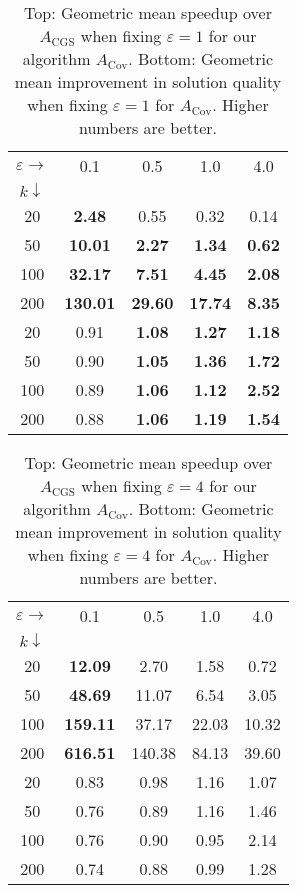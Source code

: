         \begin{table}[h!]
        \centering
        \caption{Top: Geometric mean speedup over $A_{\text{CGS}}$ when fixing $\varepsilon = 1$ for our algorithm $A_{\text{Cov}}$. Bottom: Geometric mean improvement in solution quality when fixing $\varepsilon = 1$ for $A_{\text{Cov}}$. Higher numbers are better.}
        \begin{tabular}{c|cccc}
        $\varepsilon \rightarrow$ & 0.1 & 0.5 & 1.0 & 4.0 \\
        $k \downarrow$ & & & & \\
        \hline
        20 & \textbf{2.48} & 0.55 & 0.32 & 0.14 \\
        50 & \textbf{10.01} & \textbf{2.27} & \textbf{1.34} & \textbf{0.62} \\
        100 & \textbf{32.17} & \textbf{7.51} & \textbf{4.45} & \textbf{2.08} \\
        200 & \textbf{130.01} & \textbf{29.60} & \textbf{17.74} & \textbf{8.35} \\
        \hline
        20 & 0.91 & \textbf{1.08} & \textbf{1.27} & \textbf{1.18} \\
        50 & 0.90 & \textbf{1.05} & \textbf{1.36} & \textbf{1.72} \\
        100 & 0.89 & \textbf{1.06} & \textbf{1.12} & \textbf{2.52} \\
        200 & 0.88 & \textbf{1.06} & \textbf{1.19} & \textbf{1.54} \\
        \end{tabular}
        \label{tab:table2}
        \end{table}

        \begin{table}[h]
        \centering
        \caption{Top: Geometric mean speedup over $A_{\text{CGS}}$ when fixing $\varepsilon = 4$ for our algorithm $A_{\text{Cov}}$. Bottom: Geometric mean improvement in solution quality when fixing $\varepsilon = 4$ for $A_{\text{Cov}}$. Higher numbers are better.}       
        \begin{tabular}{c|cccc}
        $\varepsilon \rightarrow$ & 0.1 & 0.5 & 1.0 & 4.0 \\
        $k \downarrow$  & & & & \\
        \hline
        20  & \textbf{12.09}  & 2.70  & 1.58  & 0.72 \\
        50  & \textbf{48.69} & 11.07  & 6.54  & 3.05 \\
        100 & \textbf{159.11} & 37.17  & 22.03  & 10.32 \\
        200 & \textbf{616.51} & 140.38 & 84.13 & 39.60 \\
        \hline
        20  & 0.83  & 0.98  & 1.16  & 1.07 \\
        50  & 0.76  & 0.89  & 1.16  & 1.46 \\
        100 & 0.76  & 0.90  & 0.95  & 2.14 \\
        200 & 0.74  & 0.88  & 0.99  & 1.28 \\
        \end{tabular}
        \label{tab:table3}
        \end{table}

